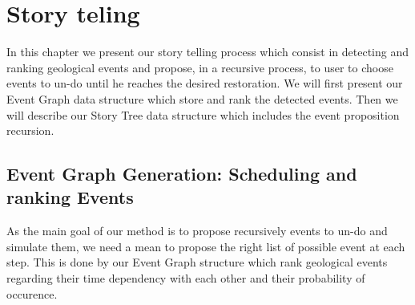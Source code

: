 \documentclass[12pt, a4paper]{report} %
\begin{document}
\chapter{Story teling}

In this chapter we present our story telling process which consist in detecting and ranking geological events and propose, in a recursive process, to user to choose events to un-do until he reaches the desired restoration.
We will first present our Event Graph data structure which store and rank the detected events. Then we will describe our Story Tree data structure which includes the event proposition recursion.

\section{Event Graph Generation: Scheduling and ranking Events}

As the main goal of our method is to propose recursively events to un-do and simulate them, we need a mean to propose the right list of possible event at each step. This is done by our Event Graph structure which rank geological events regarding their time dependency with each other and their probability of occurence.
\end{document}
